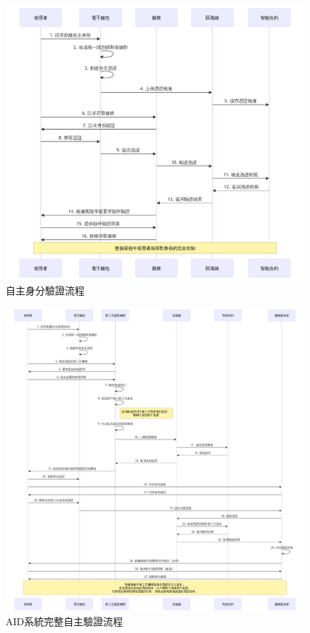 \clearpage
\begin{figure}[p]
  \centering
  \includegraphics[width=\linewidth]{figures/new-self-auth.png}
  \caption{自主身分驗證流程}
  \label{fig:appendix-self-auth}
\end{figure}
\clearpage
\begin{figure}[p]
  \centering
  \includegraphics[width=\linewidth]{figures/full-aid-auth.png}
  \caption{AID系統完整自主驗證流程}
  \label{fig:appendix-full-aid-auth}
\end{figure}
